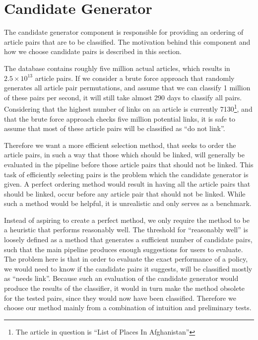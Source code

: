 \section{Candidate Generator}
The candidate generator component is responsible for providing an ordering of article pairs that are to be classified. The motivation behind this component and how we choose candidate pairs is described in this section.

The database contains roughly five million actual articles, which results in $2.5 \times 10^{13}$ article pairs. If we consider a brute force approach that randomly generates all article pair permutations, and assume that we can classify 1 million of these pairs per second, it will still take almost 290 days to classify all pairs. Considering that the highest number of links on an article is currently 7130\footnote{The article in question is \enquote{List of Places In Afghanistan}}, and that the brute force approach checks five million potential links, it is safe to assume that most of these article pairs will be classified as \enquote{do not link}.

Therefore we want a more efficient selection method, that seeks to order the article pairs, in such a way that those which should be linked, will generally be evaluated in the pipeline before those article pairs that should not be linked. This task of efficiently selecting pairs is the problem which the candidate generator is given. A perfect ordering method would result in having all the article pairs that should be linked, occur before any article pair that should not be linked. While such a method would be helpful, it is unrealistic and only serves as a benchmark.

Instead of aspiring to create a perfect method, we only require the method to be a heuristic that performs reasonably well. The threshold for \enquote{reasonably well} is loosely defined as a method that generates a sufficient number of candidate pairs, such that the main pipeline produces enough suggestions for users to evaluate. The problem here is that in order to evaluate the exact performance of a policy, we would need to know if the candidate pairs it suggests, will be classified mostly as \enquote{needs link}. Because such an evaluation of the candidate generator would produce the results of the classifier, it would in turn make the method obsolete for the tested pairs, since they would now have been classified.  Therefore we choose our method mainly from a combination of intuition and preliminary tests.

